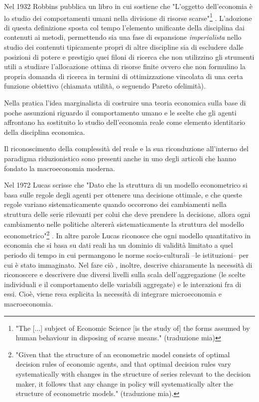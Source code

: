 \documentclass[a4paper, headings=standardclasses]{scrartcl}
\begin{document}
Nel 1932 Robbins pubblica un libro in cui sostiene che "L'oggetto dell'economia è lo studio dei comportamenti umani nella divisione di risorse scarse"\footnote{"The [...] subject of Economic Science [is the study of] the forms assumed by human behaviour in disposing of scarse means." (traduzione mia)} \parencite[p. 15]{robbins2007}.
L'adozione di questa definizione sposta col tempo l'elemento unificante della disciplina dai contenuti ai metodi, permettendo sia una fase di espansione \textit{imperialista} nello studio dei contenuti tipicamente propri di altre discipline \parencite[cfr.][]{stigler1984, lazear2000} sia di escludere dalle posizioni di potere e prestigio quei filoni di ricerca che non utilizzino gli strumenti utili a studiare l'allocazione ottima di risorse finite ovvero che non formulino la propria domanda di ricerca in termini di ottimizzazione vincolata di una certa funzione obiettivo (chiamata utilità, o seguendo Pareto ofelimità).

Nella pratica l'idea marginalista di costruire una teoria economica sulla base di poche assunzioni riguardo il comportamento umano e le scelte che gli agenti affrontano ha sostituito lo studio dell'economia reale come elemento identitario della disciplina economica.

Il riconoscimento della complessità del reale e la sua riconduzione all'interno del paradigma riduzionistico sono presenti anche in uno degli articoli che hanno fondato la macroeconomia moderna.

Nel 1972 Lucas scrisse che "Dato che la struttura di un modello econometrico si basa sulle regole degli agenti per ottenere una decisione ottimale, e che queste regole variano sistematicamente quando occorrono dei cambiamenti nella struttura delle serie rilevanti per colui che deve prendere la decisione, allora ogni cambiamento nelle politiche altererà sistematicamente la struttura del modello econometrico"\footnote{"Given that the structure of an econometric model consists of optimal decision rules of economic agents, and that optimal decision rules vary systematically with changes in the structure of series relevant to the decision maker, it follows that any change in policy will systematically alter the structure of econometric models." (traduzione mia).} \parencite{lucas1976}.
In altre parole Lucas riconosce che ogni modello quantitativo in economia che si basa su dati reali ha un dominio di validità limitato a quel periodo di tempo in cui permangono le norme socio-culturali --le istituzioni-- per cui è stato immaginato.
Nel fare ciò , inoltre, descrive chiaramente la necessità di riconoscere e descrivere due diversi livelli sulla scala dell'aggregazione (le scelte individuali e il comportamento delle variabili aggregate) e le interazioni fra di essi. Cioè, viene resa esplicita la necessità di integrare microeconomia e macroeconomia.
\end{document}

